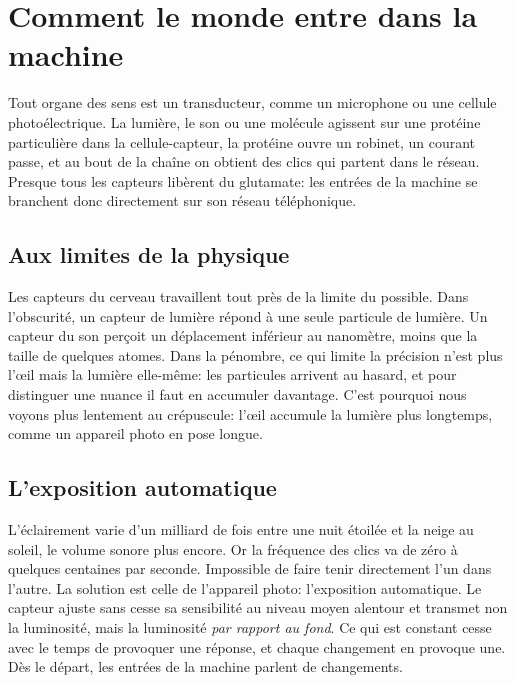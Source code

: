 \chapter{Comment le monde entre dans la machine}

Tout organe des sens est un transducteur, comme un microphone ou une cellule photoélectrique. La lumière, le son ou une molécule agissent sur une protéine particulière dans la cellule-capteur, la protéine ouvre un \og robinet\fg{}, un courant passe, et au bout de la chaîne on obtient des clics qui partent dans le réseau. Presque tous les capteurs libèrent du glutamate: les entrées de la machine se branchent donc directement sur son réseau téléphonique.

\section*{Aux limites de la physique}

Les capteurs du cerveau travaillent tout près de la limite du possible. Dans l'obscurité, un capteur de lumière répond à une seule particule de lumière. Un capteur du son perçoit un déplacement inférieur au nanomètre, moins que la taille de quelques atomes. Dans la pénombre, ce qui limite la précision n'est plus l'œil mais la lumière elle-même: les particules arrivent au hasard, et pour distinguer une nuance il faut en accumuler davantage. C'est pourquoi nous voyons plus lentement au crépuscule: l'œil accumule la lumière plus longtemps, comme un appareil photo en pose longue.

\section*{L'exposition automatique}

L'éclairement varie d'un milliard de fois entre une nuit étoilée et la neige au soleil, le volume sonore plus encore. Or la fréquence des clics va de zéro à quelques centaines par seconde. Impossible de faire tenir directement l'un dans l'autre. La solution est celle de l'appareil photo: l'exposition automatique. Le capteur ajuste sans cesse sa sensibilité au niveau moyen alentour et transmet non la luminosité, mais la luminosité \emph{par rapport au fond}. Ce qui est constant cesse avec le temps de provoquer une réponse, et chaque changement en provoque une. Dès le départ, les entrées de la machine parlent de changements.

